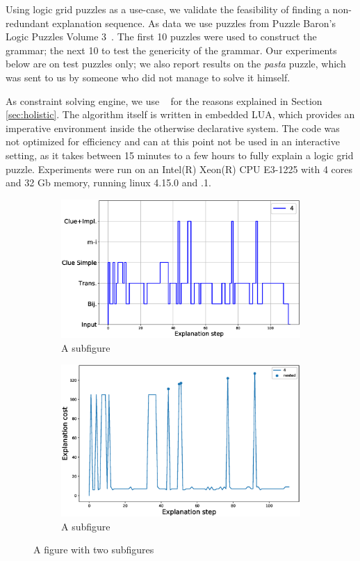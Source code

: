 Using logic grid puzzles as a use-case, we validate the feasibility of finding a non-redundant explanation sequence.
As data we use puzzles from Puzzle Baron’s Logic Puzzles Volume 3~\cite{logigrammen}. The first 10 puzzles were used to construct the grammar; the next 10 to test the genericity of the grammar. 
Our experiments below are on test puzzles only; we also report results on the \textit{pasta} puzzle, which was sent to us by someone who did not manage to solve it himself.

As constraint solving engine, we use \idp~\cite{IDP} for the reasons explained in Section \ref{sec:holistic}. 
The algorithm itself is written in embedded LUA, which provides an imperative environment inside the otherwise declarative \idp system. The code was not optimized for efficiency and can at this point not be used in an interactive setting, as it takes between 15 minutes to a few hours to fully explain a logic grid puzzle. Experiments were run on an Intel(R) Xeon(R) CPU E3-1225 with 4 cores and 32 Gb memory, running linux 4.15.0 and .1.

\begin{figure}
\centering
\begin{subfigure}{.5\textwidth}
\centering
\includegraphics[width=\linewidth]{figures/plot_cost_steps_4.eps}
\caption{A subfigure}
\label{fig:sub1}
\end{subfigure}%
\begin{subfigure}{.5\textwidth}
\centering
\includegraphics[width=0.9\linewidth]{figures/4.eps}
\caption{A subfigure}
\label{fig:sub2}
\end{subfigure}
\caption{A figure with two subfigures}
\label{fig:test}
\end{figure}


